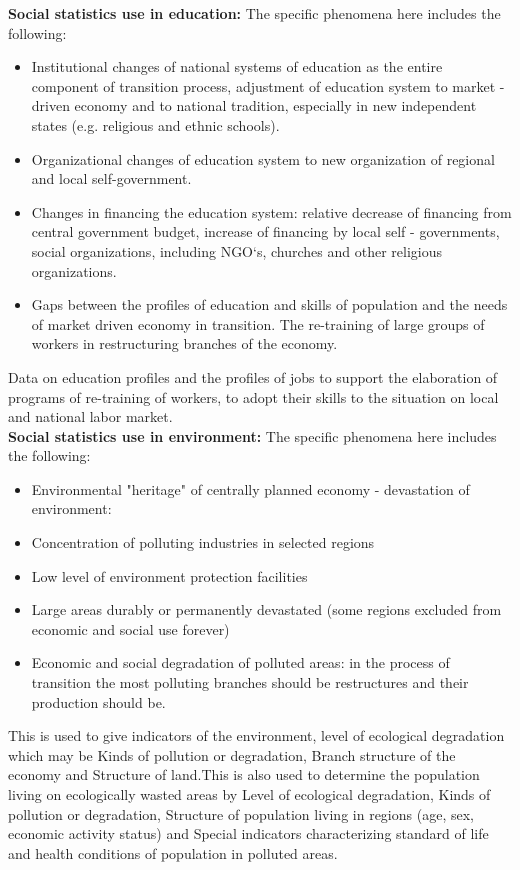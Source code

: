 \documentclass[11pt]{article}
\begin{document}
\noindent\textbf{Social statistics use in education:} The specific phenomena here includes the following:

\begin{itemize}
\item Institutional changes of national systems of education as the entire component of transition process, adjustment of education system to market - driven economy and to national tradition, especially in new independent states (e.g. religious and ethnic schools).
\item Organizational changes of education system to new organization of regional and local self-government.
\item Changes in financing the education system: relative decrease of financing from central government budget, increase of financing by local self - governments, social organizations, including NGO`s, churches and other religious organizations.
\item Gaps between the profiles of education and skills of population and the needs of market driven economy in transition. The re-training of large groups of workers in restructuring branches of the economy.
\end{itemize}
\noindent Data on education profiles and the profiles of jobs to support the elaboration of programs of re-training of workers, to adopt their skills to the situation on local and national labor market. \\

\noindent\textbf{Social statistics use in environment:} The specific phenomena here includes the following:
\begin{itemize}
\item Environmental "heritage" of centrally planned economy - devastation of environment:
\item Concentration of polluting industries in selected regions
\item Low level of environment protection facilities
\item Large areas durably or permanently devastated (some regions excluded from economic and social use forever)
\item Economic and social degradation of polluted areas: in the process of transition the
  most polluting branches should be restructures and their production should be.
\end{itemize}
\noindent This is used to give indicators of the environment, level of ecological degradation which may be Kinds of pollution or degradation, Branch structure of the economy and Structure of land.This is also used to determine the population living on ecologically wasted areas by Level of ecological degradation, Kinds of pollution or degradation, Structure of population living in regions (age, sex, economic activity status) and Special indicators characterizing standard of life and health conditions of population in polluted areas. \\
\end{document}
